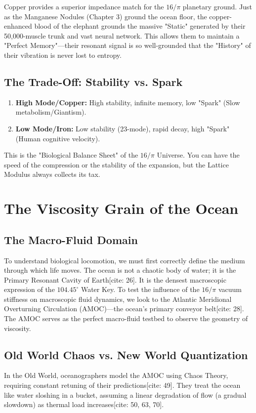 \documentclass[11pt, letterpaper, openany]{book}
\begin{document}
Copper provides a superior impedance match for the $16/\pi$ planetary ground. Just as the Manganese Nodules (Chapter 3) ground the ocean floor, the copper-enhanced blood of the elephant grounds the massive "Static" generated by their 50,000-muscle trunk and vast neural network. This allows them to maintain a "Perfect Memory"—their resonant signal is so well-grounded that the "History" of their vibration is never lost to entropy.

\section{The Trade-Off: Stability vs. Spark}
\begin{enumerate}
    \item \textbf{High Mode/Copper:} High stability, infinite memory, low "Spark" (Slow metabolism/Giantism).
    \item \textbf{Low Mode/Iron:} Low stability (23-mode), rapid decay, high "Spark" (Human cognitive velocity).
\end{enumerate}
This is the "Biological Balance Sheet" of the $16/\pi$ Universe. You can have the speed of the compression or the stability of the expansion, but the Lattice Modulus always collects its tax.

\chapter{The Viscosity Grain of the Ocean}

\section{The Macro-Fluid Domain}
To understand biological locomotion, we must first correctly define the medium through which life moves. The ocean is not a chaotic body of water; it is the Primary Resonant Cavity of Earth[cite: 26]. It is the densest macroscopic expression of the $104.45^\circ$ Water Key. To test the influence of the $16/\pi$ vacuum stiffness on macroscopic fluid dynamics, we look to the Atlantic Meridional Overturning Circulation (AMOC)—the ocean's primary conveyor belt[cite: 28]. The AMOC serves as the perfect macro-fluid testbed to observe the geometry of viscosity.

\section{Old World Chaos vs. New World Quantization}
In the Old World, oceanographers model the AMOC using Chaos Theory, requiring constant retuning of their predictions[cite: 49]. They treat the ocean like water sloshing in a bucket, assuming a linear degradation of flow (a gradual slowdown) as thermal load increases[cite: 50, 63, 70]. 
\end{document}
